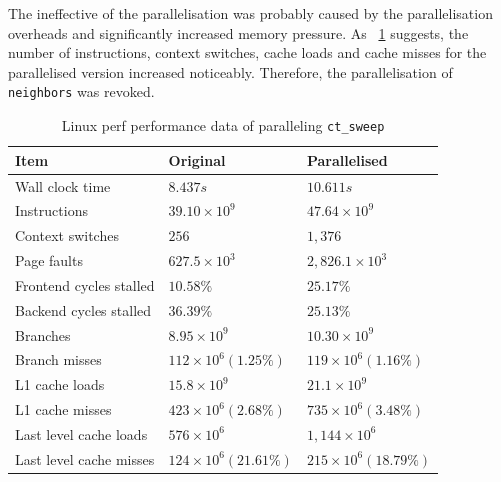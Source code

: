\documentclass[conference]{IEEEtran}
\newcommand{\tref}[1]{\tablename~\ref{#1}}
\newcommand{\sci}[1]{\times 10 ^ #1}
\begin{document}
The ineffective of the parallelisation was probably caused by the parallelisation overheads and significantly increased memory pressure. As \tref{tbl:sweep} suggests, the number of instructions, context switches, cache loads and cache misses for the parallelised version increased noticeably. Therefore, the parallelisation of \texttt{neighbors} was revoked.

\begin{table}[!t]
	\renewcommand{\arraystretch}{1.3}
	\caption{Linux perf performance data of paralleling \texttt{ct\_sweep}}
	\label{tbl:sweep}
	\centering
	\begin{tabular}{lll}
		\hline
		Item			& Original		& Parallelised		\\
		\hline
		Wall clock time		& $8.437 s$		& $10.611 s$		\\
		Instructions		& $39.10 \sci{9}$	& $47.64 \sci{9}$	\\
		Context switches	& $256$			& $1,376$		\\
		Page faults		& $627.5 \sci{3}$	& $2,826.1 \sci{3}$	\\
		Frontend cycles stalled	& $10.58 \%$		& $25.17 \%$		\\
		Backend cycles stalled	& $36.39 \%$		& $25.13 \%$		\\
		Branches		& $8.95 \sci{9}$	& $10.30 \sci{9}$	\\
		Branch misses		& $112 \sci{6} (1.25 \%)$	& $119 \sci{6} (1.16 \%)$	\\
		L1 cache loads		& $15.8 \sci{9}$	& $21.1 \sci{9}$	\\
		L1 cache misses		& $423 \sci{6} (2.68 \%)$	& $735 \sci{6} (3.48 \%)$	\\
		Last level cache loads	& $576 \sci{6}$	& $1,144 \sci{6}$	\\
		Last level cache misses	& $124 \sci{6} (21.61 \%)$	& $215 \sci{6} (18.79 \%)$	\\
		\hline
	\end{tabular}
\end{table}


\end{document}
